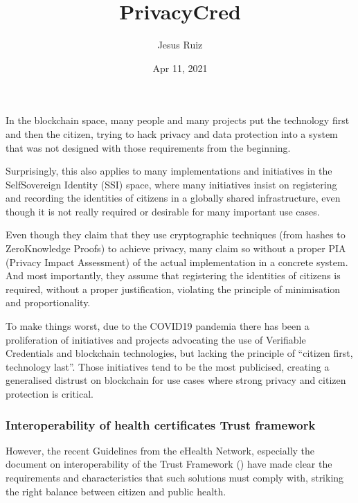 \documentclass[a4paper,12pt,english]{sphinxhowto}
\title{PrivacyCred}
\date{Apr 11, 2021}
\author{Jesus Ruiz}
\begin{document}
\pagestyle{empty}
\sphinxmaketitle
\pagestyle{plain}
\sphinxtableofcontents
\pagestyle{normal}
\label{\detokenize{index::doc}}


\sphinxAtStartPar
In the blockchain space, many people and many projects put the technology first and then the citizen, trying to hack privacy and data protection into a system that was not designed with those requirements from the beginning.

\sphinxAtStartPar
Surprisingly, this also applies to many implementations and initiatives in the Self\sphinxhyphen{}Sovereign Identity (SSI) space, where many initiatives insist on registering and recording the identities of citizens in a globally shared infrastructure, even though it is not really required or desirable for many important use cases.

\sphinxAtStartPar
Even though they claim that they use cryptographic techniques (from hashes to Zero\sphinxhyphen{}Knowledge Proofs) to achieve privacy, many claim so without a proper PIA (Privacy Impact Assessment) of the actual implementation in a concrete system. And most importantly, they assume that registering the identities of citizens is required, without a proper justification, violating the principle of minimisation and proportionality.

\sphinxAtStartPar
To make things worst, due to the COVID\sphinxhyphen{}19 pandemia there has been a proliferation of initiatives and projects advocating the use of Verifiable Credentials and blockchain technologies, but lacking the principle of “citizen first, technology last”. Those initiatives tend to be the most publicised, creating a generalised distrust on blockchain for use cases where strong privacy and citizen protection is critical.
\subsubsection*{Interoperability of health certificates Trust framework}

\sphinxAtStartPar
However, the recent Guidelines from the eHealth Network, especially the document on interoperability of the Trust Framework () have made clear the requirements and characteristics that such solutions must comply with, striking the right balance between citizen and public health.
\end{document}
